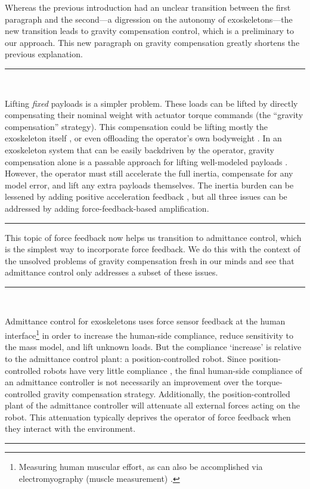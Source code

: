\documentclass[10pt,letterpaper]{letter}
\newcommand*{\ta}[1]{\textcolor[HTML]{107f10}{#1}}
\newcommand*{\ra}[1]{}
\newcommand{\paperquote}[1]{%
	\begin{center}
		
		\begin{minipage}{.8\textwidth}
			{\rule{\textwidth}{.5pt}}\vspace{.5em}\\
			\begin{minipage}{\textwidth}\setlength{\parindent}{2em}#1\end{minipage}
			\vspace{.5em}
			{\rule{\textwidth}{.5pt}}
		\end{minipage}%
	\end{center}
}
\begin{document}
\begin{letter}{}
Whereas the previous introduction had an unclear transition between the first paragraph and the second---a digression on the autonomy of exoskeletons---the new transition leads to gravity compensation control, which is a preliminary to our approach. This new paragraph on gravity compensation greatly shortens the previous explanation.

\paperquote{%
\ta{Lifting \emph{fixed} payloads is a simpler problem. These loads can be lifted by directly compensating their nominal weight with actuator torque commands (the ``gravity compensation'' strategy).}
\ta{This compensation could be lifting mostly the exoskeleton itself \cite{KazerooniRacineHuangSteger2005ICRA}, or even offloading the operator's own bodyweight \cite{KongMoonJeonTomizuka2010TMech,LvZhuGregg2018CSM,LinLvGregg2019ACC}.}
\ra{\ta{Proper compensation} requires a decent model of the \ta{mass of the} exoskeleton \ta{and payload}\ra{mass}\ra{, h}\ta{.}}%
\ra{A \ra{backdrivable} system }\ta{In an exoskeleton system that can be easily backdriven by the operator, gravity compensation alone is a passable approach for\ra{ the}} \ra{capability platform application}\ta{lifting well-modeled payloads} \cite{Campbell2018Thesis}.
\ta{However, the operator must still accelerate the full inertia, compensate for any model error, and lift any extra payloads themselves.
	The inertia burden can be lessened by adding positive acceleration feedback \cite{Kazerooni2005IROS,KongTomizuka2009TMech}, but all three issues can be addressed by adding force-feedback-based amplification.}
}
This topic of force feedback now helps us transition to admittance control, which is the simplest way to incorporate force feedback. We do this with the context of the unsolved problems of gravity compensation fresh in our minds and see that admittance control only addresses a subset of these issues.
\paperquote{%
\ta{Admittance control for exoskeletons \cite{YuRosen2013TCyb,FontanaVertechyMarcheschiSalsedoBergamasco2014RAM,JacobsenOlivier2014Patent,LecoursStongeGosselin2012ICRA} uses force sensor feedback at the human interface\footnote{\ta{Measuring human muscular effort, as can also be accomplished via electromyography (muscle measurement)} \cite{KawamotoSankai2005AR,YoungFerris2016TNSRE}.} in order to increase the human-side compliance, reduce sensitivity to the mass model, and lift unknown loads. But the compliance `increase' is relative to the admittance control plant: a position-controlled robot. Since position-controlled robots have very little compliance \cite{YuRosen2013TCyb,GonzalezAsada2019RAL}, the final human-side compliance of an admittance controller is not necessarily an improvement over the torque-controlled gravity compensation strategy. Additionally, the position-controlled plant of the admittance controller will attenuate all external forces acting on the robot. This attenuation typically deprives the operator of force feedback when they interact with the environment.}
}
\end{letter}
\end{document}
